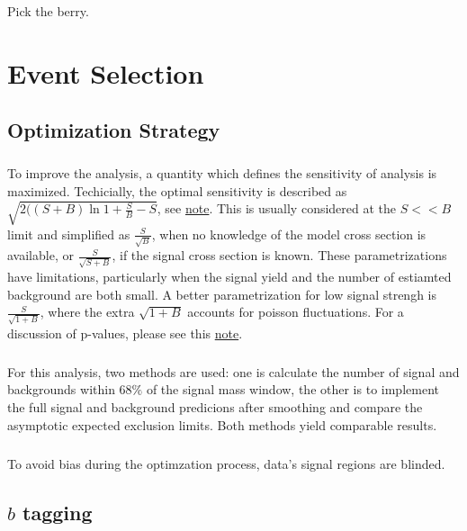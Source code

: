 \begin{savequote}[75mm]
Pick the berry.
\end{savequote}

\chapter{Event Selection}


\section{Optimization Strategy}
\paragraph{}
To improve the analysis, a quantity which defines the sensitivity of analysis is maximized. Techicially, the optimal sensitivity is described as $\sqrt{2((S+B)\ln{1 + \frac{S}{B}} - S}$, see \href{https://www.pp.rhul.ac.uk/~cowan/stat/notes/SigCalcNote.pdf}{note}. This is usually considered at the $S << B$ limit and simplified as $\frac{S}{\sqrt{B}}$, when no knowledge of the model cross section is available, or $\frac{S}{\sqrt{S + B}}$, if the signal cross section is known. These parametrizations have limitations, particularly when the signal yield and the number of estiamted background are both small. A better parametrization for low signal strengh is $\frac{S}{\sqrt{1 + B}}$, where the extra $\sqrt{1 + B}$ accounts for poisson fluctuations. For a discussion of p-values, please see this \href{https://arxiv.org/pdf/hep-ex/0208005.pdf}{note}.

\paragraph{}
For this analysis, two methods are used: one is calculate the number of signal and backgrounds within $68\%$ of the signal \mhh mass window, the other is to implement the full signal and background predicions after smoothing and compare the asymptotic expected exclusion limits. Both methods yield comparable results.

\paragraph{}
To avoid bias during the optimzation process, data's signal regions are blinded.


\section{$b$ tagging}
